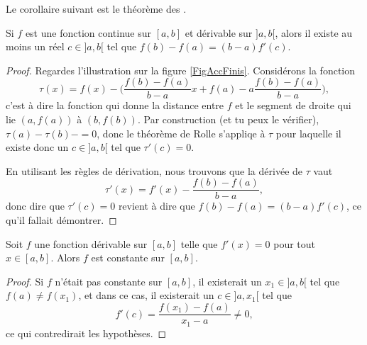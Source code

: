 \documentclass{article}
\begin{document}
Le corollaire suivant est le théorème des .

\begin{theorem}		\label{ThoAccFinis}
	Si $f$ est une fonction continue sur $[a,b]$ et dérivable sur $]a,b[$, alors il existe au moins un réel $c\in]a,b[$ tel que $f(b)-f(a)=(b-a)f'(c)$.
\end{theorem}

\newcommand{\CaptionAccfinis}{Illustration du théorème des accroissements finis. Nous avons effectivement qu'au point $c$, la tangente est parallèle au segment qui joint $a$ et $b$.}


\begin{proof}
	Regardes l'illustration sur la figure \ref{FigAccFinis}. Considérons la fonction
	\begin{equation}
		\tau(x)=f(x)-\big( \frac{ f(b)-f(a) }{ b-a }x + f(a) - a\frac{ f(b)-f(a) }{ b-a } \big),
	\end{equation}
	c'est à dire la fonction qui donne la distance entre $f$ et le segment de droite qui lie $(a,f(a))$ à $(b,f(b))$. Par construction (et tu peux le vérifier), $\tau(a)-\tau(b)-=0$, donc le théorème de Rolle s'appliqe à $\tau$ pour laquelle il existe donc un $c\in]a,b[$ tel que $\tau'(c)=0$.

	En utilisant les règles de dérivation, nous trouvons que la dérivée de $\tau$ vaut
	\begin{equation}
		\tau'(x)= f'(x)-\frac{ f(b)-f(a) }{ b-a },
	\end{equation}
	donc dire que $\tau'(c)=0$ revient à dire que $f(b)-f(a)=(b-a)f'(c)$, ce qu'il fallait démontrer.
\end{proof}

\begin{corollary}
Soit $f$ une fonction dérivable sur $[a,b]$ telle que $f'(x) = 0$ pour tout $x \in [a,b]$. Alors $f$ est constante sur $[a,b]$.
\end{corollary}

\begin{proof}
	Si $f$ n'était pas constante sur $[a,b]$, il existerait un $x_1\in ]a,b[$ tel que $f(a)\neq f(x_1)$, et dans ce cas, il existerait un $c\in]a,x_1[$ tel que 
	\begin{equation}
		f'(c)=\frac{ f(x_1)-f(a) }{ x_1-a }\neq 0,
	\end{equation}
	ce qui contredirait les hypothèses.
\end{proof}
\end{document}
